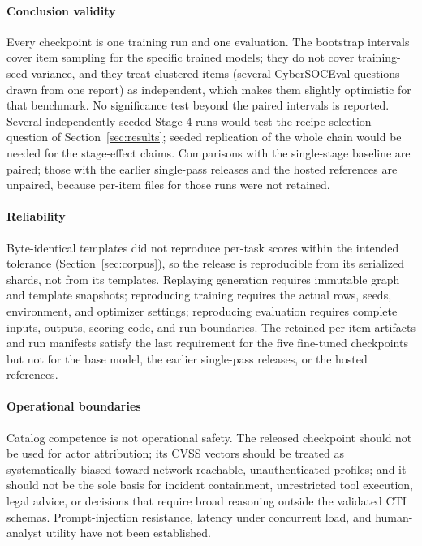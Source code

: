 \documentclass[twocolumn]{svjour3}
\begin{document}
\paragraph{Conclusion validity}
Every checkpoint is one training run and one evaluation. The bootstrap intervals cover item sampling for the specific trained models; they do not cover training-seed variance, and they treat clustered items (several CyberSOCEval questions drawn from one report) as independent, which makes them slightly optimistic for that benchmark. No significance test beyond the paired intervals is reported. Several independently seeded Stage-4 runs would test the recipe-selection question of Section~\ref{sec:results}; seeded replication of the whole chain would be needed for the stage-effect claims. Comparisons with the single-stage baseline are paired; those with the earlier single-pass releases and the hosted references are unpaired, because per-item files for those runs were not retained.

\paragraph{Reliability}
Byte-identical templates did not reproduce per-task scores within the intended tolerance (Section~\ref{sec:corpus}), so the release is reproducible from its serialized shards, not from its templates. Replaying generation requires immutable graph and template snapshots; reproducing training requires the actual rows, seeds, environment, and optimizer settings; reproducing evaluation requires complete inputs, outputs, scoring code, and run boundaries. The retained per-item artifacts and run manifests satisfy the last requirement for the five fine-tuned checkpoints but not for the base model, the earlier single-pass releases, or the hosted references.

\paragraph{Operational boundaries}
Catalog competence is not operational safety. The released checkpoint should not be used for actor attribution; its CVSS vectors should be treated as systematically biased toward network-reachable, unauthenticated profiles; and it should not be the sole basis for incident containment, unrestricted tool execution, legal advice, or decisions that require broad reasoning outside the validated CTI schemas. Prompt-injection resistance, latency under concurrent load, and human-analyst utility have not been established.
\end{document}
